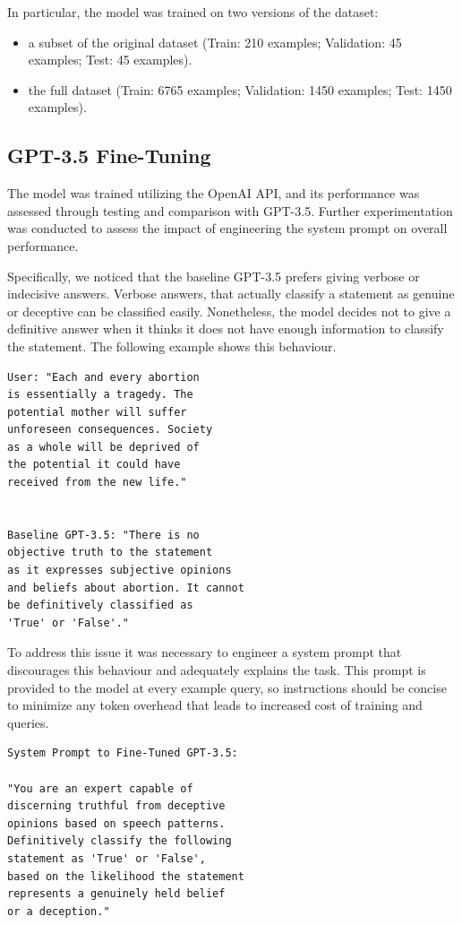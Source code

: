 \documentclass[10pt,twocolumn,letterpaper]{article}
\begin{document}
In particular, the model was trained on two versions of the dataset:

\begin{itemize}
    \item a subset of the original dataset (Train: 210 examples; Validation: 45 examples; Test: 45 examples).
    \item the full dataset (Train: 6765 examples; Validation: 1450 examples; Test: 1450 examples).
\end{itemize}

\subsection{GPT-3.5 Fine-Tuning}
The model was trained utilizing the OpenAI API, and its performance was assessed through 
testing and comparison with GPT-3.5. Further experimentation was conducted to assess 
the impact of engineering the system prompt on overall performance.

Specifically, we noticed that the baseline GPT-3.5 prefers giving verbose or indecisive answers.
Verbose answers, that actually classify a statement as genuine or deceptive can be classified easily.
Nonetheless, the model decides not to give a definitive answer when it thinks it does not have enough information to classify the statement.
The following example shows this behaviour.

\begin{verbatim}
User: "Each and every abortion 
is essentially a tragedy. The 
potential mother will suffer 
unforeseen consequences. Society
as a whole will be deprived of 
the potential it could have 
received from the new life."

   
Baseline GPT-3.5: "There is no 
objective truth to the statement 
as it expresses subjective opinions
and beliefs about abortion. It cannot 
be definitively classified as 
'True' or 'False'."
\end{verbatim}   

To address this issue it was necessary to engineer a system prompt that
discourages this behaviour and adequately explains the task. This prompt
is provided to the model at every example query, so instructions should
be concise to minimize any token overhead that leads to increased cost of
training and queries.

\begin{verbatim}
System Prompt to Fine-Tuned GPT-3.5:

"You are an expert capable of
discerning truthful from deceptive
opinions based on speech patterns. 
Definitively classify the following 
statement as 'True' or 'False', 
based on the likelihood the statement
represents a genuinely held belief 
or a deception."
\end{verbatim}
\end{document}
